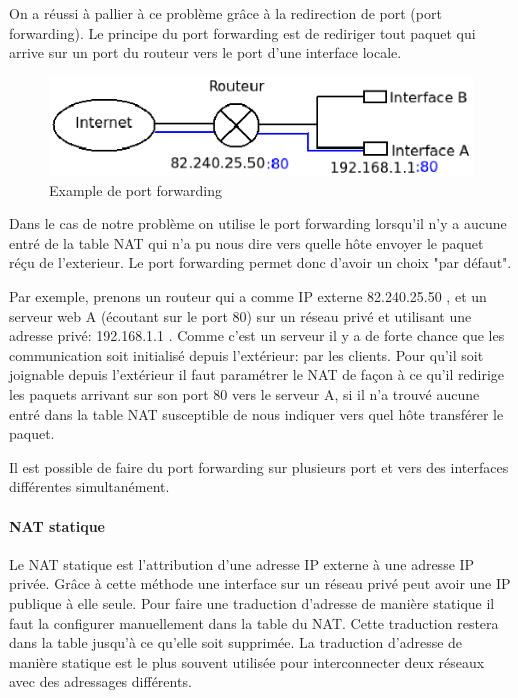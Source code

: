 On a réussi à pallier à ce problème grâce à la redirection de port (port
forwarding).  Le principe du port forwarding est de rediriger tout paquet qui
arrive sur un port du routeur vers le port d'une interface locale.

\begin{figure}[h]
\centering
\includegraphics{./pics/port_forwarding.eps}
\caption{Example de port forwarding}
\label{fig:portfow}
\end{figure}

Dans le cas de notre problème on utilise le port forwarding lorsqu'il n'y a
aucune entré de la table NAT qui n'a pu nous dire vers quelle hôte envoyer le
paquet réçu de l'exterieur.  Le port forwarding permet donc d'avoir un choix
"par défaut".

Par exemple, prenons un routeur qui a comme IP externe 82.240.25.50 , et un
serveur web A (écoutant sur le port 80) sur un réseau privé et utilisant une
adresse privé: 192.168.1.1 . Comme c'est un serveur il y a de forte chance que
les communication soit initialisé depuis l'extérieur: par les clients.  Pour
qu'il soit joignable depuis l'extérieur il faut paramétrer le NAT de façon à ce
qu'il redirige les paquets arrivant sur son port 80 vers le serveur A, si il
n'a trouvé aucune entré dans la table NAT susceptible de nous indiquer vers
quel hôte transférer le paquet.


Il est possible de faire du port forwarding sur plusieurs port et vers des
interfaces différentes simultanément.

\paragraph{NAT statique}
Le NAT statique est l'attribution d'une adresse IP externe à une adresse IP
privée. Grâce à cette méthode une interface sur un réseau privé peut avoir une
IP publique à elle seule. Pour faire une traduction d'adresse de manière
statique il faut la configurer manuellement dans la table du NAT. Cette
traduction restera dans la table jusqu'à ce qu'elle soit supprimée. La
traduction d'adresse de manière statique est le plus souvent utilisée pour
interconnecter deux réseaux avec des adressages différents.

